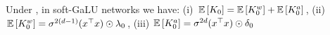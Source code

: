 \begin{lemma} Under , in soft-GaLU networks we have: (i) $\mathbb{E}\left[K_0\right]=\mathbb{E}\left[K^w_0\right]+\mathbb{E}\left[K^a_0\right]$, 
 (ii) $\mathbb{E}\left[K^w_0\right]=\sigma^{2(d-1)} (x^\top x)\odot \lambda_0$,  (iii) $\mathbb{E}\left[K^a_0\right]=\sigma^{2d}  (x^\top x)\odot \delta_0$
\end{lemma}

